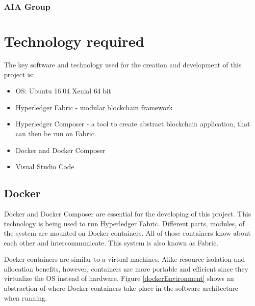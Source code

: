 \documentclass[a4paper,11pt]{report}
\begin{document}
\subsection{AIA Group}


\chapter{Technology required}            %

\label{technical}

The key software and technology used for the creation and development of this project is:
\begin{itemize}
\item OS: Ubuntu 16.04 Xenial 64 bit
\item Hyperledger Fabric - modular blockchain framework
\item Hyperledger Composer - a tool to create abstract blockchain application, that can then be run on Fabric.
\item Docker and Docker Composer
\item Visual Studio Code
\end{itemize}


\section{Docker}
\label{docker}
Docker and Docker Composer are essential for the developing of this project. This technology is being used to run Hyperledger Fabric. Different parts, modules, of the system are mounted on Docker containers. All of those containers know about each other and intercommunicate. This system is also known as Fabric.

	Docker containers are similar to a virtual machines. Alike resource isolation and allocation benefits, however, containers are more portable and efficient since they virtualize the OS instead of hardware.\cite{dockerContainer} Figure \ref{dockerEnvironment} shows an abstraction of where Docker containers take place in the software architecture when running.
\end{document}

